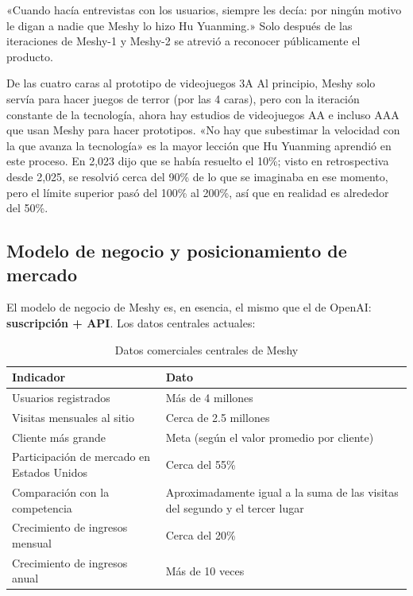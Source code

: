 «Cuando hacía entrevistas con los usuarios, siempre les decía: por ningún motivo le digan a nadie que Meshy lo hizo Hu Yuanming.» Solo después de las iteraciones de Meshy-1 y Meshy-2 se atrevió a reconocer públicamente el producto.

\begin{knowledgebox}{De las cuatro caras al prototipo de videojuegos 3A}
Al principio, Meshy solo servía para hacer juegos de terror (por las 4 caras), pero con la iteración constante de la tecnología, ahora hay estudios de videojuegos AA e incluso AAA que usan Meshy para hacer prototipos. «No hay que subestimar la velocidad con la que avanza la tecnología» es la mayor lección que Hu Yuanming aprendió en este proceso. En 2,023 dijo que se había resuelto el 10\%; visto en retrospectiva desde 2,025, se resolvió cerca del 90\% de lo que se imaginaba en ese momento, pero el límite superior pasó del 100\% al 200\%, así que en realidad es alrededor del 50\%.
\end{knowledgebox}

\subsection{Modelo de negocio y posicionamiento de mercado}

El modelo de negocio de Meshy es, en esencia, el mismo que el de OpenAI: \textbf{suscripción + API}. Los datos centrales actuales:

\begin{table}[H]
\centering
\caption{Datos comerciales centrales de Meshy}
\begin{tabular}{ll}
\toprule
\textbf{Indicador} & \textbf{Dato} \\
\midrule
Usuarios registrados & Más de 4 millones \\
Visitas mensuales al sitio & Cerca de 2.5 millones \\
Cliente más grande & Meta (según el valor promedio por cliente) \\
Participación de mercado en Estados Unidos & Cerca del 55\% \\
Comparación con la competencia & Aproximadamente igual a la suma de las visitas del segundo y el tercer lugar \\
Crecimiento de ingresos mensual & Cerca del 20\% \\
Crecimiento de ingresos anual & Más de 10 veces \\
\bottomrule
\end{tabular}
\end{table}

